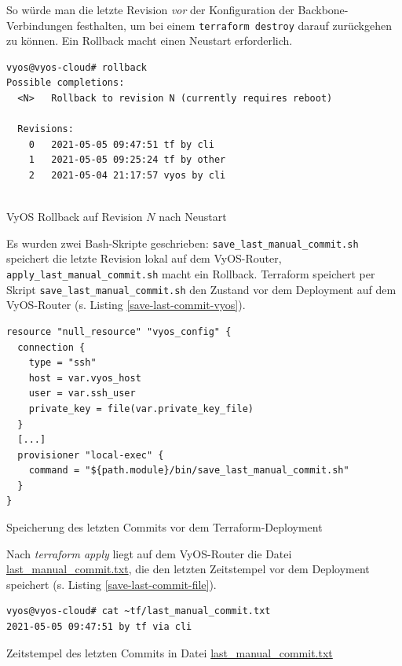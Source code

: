 So würde man die letzte Revision \textit{vor} der Konfiguration der Backbone-Verbindungen festhalten, um bei einem \texttt{terraform destroy} darauf zurückgehen zu können. Ein Rollback macht einen Neustart erforderlich.
\begin{listing}[h]
\begin{verbatim}
vyos@vyos-cloud# rollback
Possible completions:
  <N>   Rollback to revision N (currently requires reboot)

  Revisions:
    0   2021-05-05 09:47:51 tf by cli
    1   2021-05-05 09:25:24 tf by other
    2   2021-05-04 21:17:57 vyos by cli
    
\end{verbatim}
\caption{VyOS Rollback auf Revision $N$ nach Neustart}
\label{rollback-cmd-vyos}
\end{listing}\FloatBarrier
Es wurden zwei Bash-Skripte geschrieben: \texttt{save\_last\_manual\_commit.sh} speichert die letzte Revision lokal auf dem VyOS-Router, \texttt{apply\_last\_manual\_commit.sh} macht ein Rollback. Terraform speichert per Skript \texttt{save\_last\_manual\_commit.sh} den Zustand vor dem \gls{Deployment} auf dem VyOS-Router (s. Listing \ref{save-last-commit-vyos}).
\begin{listing}[h]
\begin{verbatim}
resource "null_resource" "vyos_config" {
  connection {
    type = "ssh"
    host = var.vyos_host
    user = var.ssh_user
    private_key = file(var.private_key_file)
  }
  [...]
  provisioner "local-exec" {
    command = "${path.module}/bin/save_last_manual_commit.sh"
  }
}

\end{verbatim}
\caption{Speicherung des letzten Commits vor dem Terraform-Deployment}
\label{save-last-commit-vyos}
\end{listing}\FloatBarrier
Nach \textit{terraform apply} liegt auf dem VyOS-Router die Datei \underline{last\_manual\_commit.txt}, die den letzten Zeitstempel vor dem Deployment speichert (s. Listing \ref{save-last-commit-file}).
\begin{listing}[h]
\begin{verbatim}
vyos@vyos-cloud# cat ~tf/last_manual_commit.txt
2021-05-05 09:47:51 by tf via cli
\end{verbatim}
\caption{Zeitstempel des letzten Commits in Datei \underline{last\_manual\_commit.txt}}
\label{save-last-commit-file}
\end{listing}\FloatBarrier
